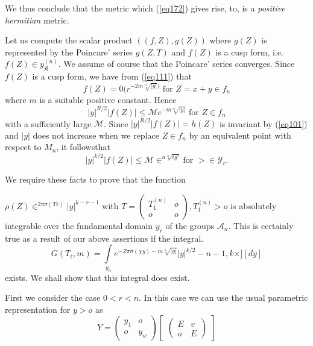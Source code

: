  We thus conclude that the metric which (\ref{eq172}) gives rise, to, is a
 \textit{positive hermitian} metric. 
 
 Let us compute the scalar product $((f,Z), g(Z))$ where $g(Z)$ is
 represented by the Poincare' series $g(Z,T)$ and $f(Z)$ is a cusp
 form, i.e. $f(Z) \in y^{(n)}_{\mathfrak{K}}$. We assume of course
 that the Poincare' series converges. Since $f(Z)$ is a cusp form, we
 have from (\ref{eq111}) that  
 $$
 f(Z) = 0(r^{-2m  {\sqrt[n]{|y|}})} \text{ for } Z= x+ y \in f_n 
 $$
 where $m$ is a suitable positive constant. Hence 
 $$
 |y|^{R/2}|f(Z) |\le \mathcal{M} e^{-m \sqrt[n]{|y|}}  \text{ for } Z
 \in f_n 
 $$
 with a sufficiently large $\mathcal{M}$. Since $|y|^{R/2} |f(Z)|=
 h(Z)$ is invariant by (\ref{eq101}) and $|y|$ does not increase when we
 replace $Z \in f_n$ by an equivalent point  with respect to $M_n$, 
it follows\pageoriginale  that
$$
| y |^{k/2} |f (Z) | \le  \mathcal{M} \in^{n \sqrt[n]{i y'}} \text
{for } > \in \mathscr{Y}_r. 
$$

We require these facts to prove that the function

$\rho (Z) \in^{2 \pi \sigma (T \varepsilon)} | y |^{k - r - 1}$
\qquad with $T = \begin{pmatrix} T^{(n)}_1 & o \\ o & o \end{pmatrix},
T^{(n)}_1 > o$  
is absolutely integrable over the fundamental domain $y_r$ of the
groups $\mathcal{A}_n $. This is certainly true as a result of our
above assertions if the integral. 
\begin{equation*}
G (T_\ell, m) = \int\limits_{y_n} e^{-Z \pi \sigma (\chi y) - m
  \sqrt[n]{| y |} } | y |^{k/2} - n - 1, k \times ] [dy]
  \tag{173}\label{eq173}   
\end{equation*}
exists. We shall show that this integral does exist.

First we consider the case $0 < r < n$. In this case we can use the
usual parametric representation for $y > o$ as  
\begin{equation*}
Y = 
\begin{pmatrix}
y_1 & o \\ o & y_w
\end{pmatrix}
\begin{bmatrix}
\begin{pmatrix}
E & v \\ o & E
 \end{pmatrix}
\end{bmatrix}
\end{equation*}


